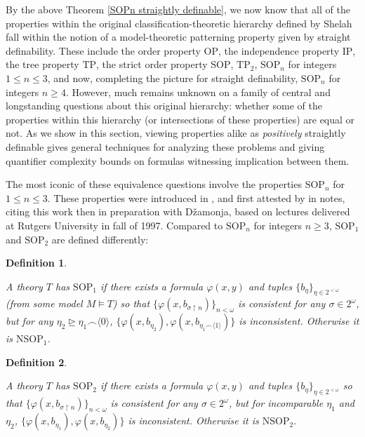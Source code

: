 \documentclass[10pt,a4paper]{amsart}
\newtheorem{definition}{Definition}
\begin{document}
By the above Theorem \ref{SOPn straightly definable}, we now know that all of the properties within the original classification-theoretic hierarchy defined by Shelah fall within the notion of a model-theoretic patterning property given by straight definability. These include the order property $\mathrm{OP}$, the independence property $\mathrm{IP}$, the tree property $\mathrm{TP}$, the strict order property $\mathrm{SOP}$, $\mathrm{TP}_{2}$, $\mathrm{SOP}_{n}$ for integers $1 \leq n \leq 3$, and now, completing the picture for straight definability, $\mathrm{SOP}_{n}$ for integers $n \geq 4$. However, much remains unknown on a family of central and longstanding questions about this original hierarchy: whether some of the properties within this hierarchy (or intersections of these properties) are equal or not. As we show in this section, viewing properties alike as \textit{positively} straightly definable gives general techniques for analyzing these problems and giving quantifier complexity bounds on formulas witnessing implication between them.

The most iconic of these equivalence questions involve the properties $\mathrm{SOP}_{n}$ for $1 \leq n \leq 3$. These properties were introduced in \cite{Dzamonja2004}, and first attested by \cite{shelah_what_2000} in notes, citing this work then in preparation with Džamonja, based on lectures delivered at Rutgers University in fall of 1997. Compared to $\mathrm{SOP}_{n}$ for integers $n \geq 3$, $\mathrm{SOP}_{1}$ and $\mathrm{SOP}_{2}$ are defined differently:

\begin{definition}
\label{1-strict order property}


A theory $T$ has $\mathrm{SOP}_{1}$ if there exists a formula $\varphi(x, y)$ and tuples $\{b_{\eta}\}_{\eta \in 2^{<\omega}}$ (from some model $M \models T$) so that $\{\varphi(x, b_{\sigma \upharpoonright n})\}_{n < \omega}$ is consistent for any $\sigma \in 2^{\omega}$, but for any $\eta_{2} \unrhd \eta_{1} \smallfrown \langle 0\rangle$, $\{\varphi(x, b_{\eta_{2}}), \varphi(x, b_{\eta_{1} \smallfrown \langle 1\rangle})\}$ is inconsistent. Otherwise it is $\mathrm{NSOP}_{1}$.
\end{definition}

\begin{definition}
\label{2-strict order property}

A theory $T$ has $\mathrm{SOP}_{2}$ if there exists a formula $\varphi(x, y)$ and tuples $\{b_{\eta}\}_{\eta \in 2^{<\omega}}$ so that $\{\varphi(x, b_{\sigma \upharpoonright n})\}_{n < \omega}$ is consistent for any $\sigma \in 2^{\omega}$, but for incomparable $\eta_{1}$ and $\eta_{2}$, $\{\varphi(x, b_{\eta_{1}}), \varphi(x, b_{\eta_{2}})\}$ is inconsistent. Otherwise it is $\mathrm{NSOP}_{2}$.
\end{definition}
\end{document}

